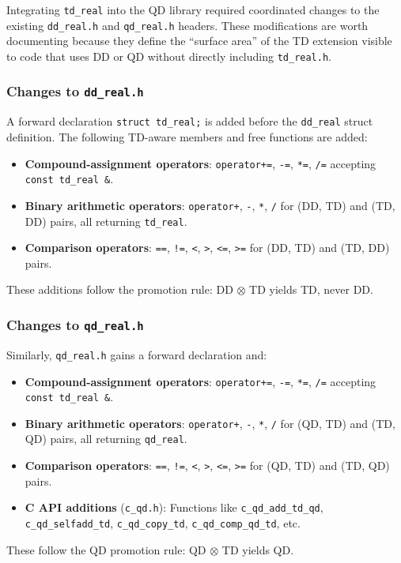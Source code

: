 \documentclass[11pt,a4paper]{article}
\begin{document}
Integrating \texttt{td\_real} into the QD library required
coordinated changes to the existing \texttt{dd\_real.h} and
\texttt{qd\_real.h} headers.  These modifications are worth
documenting because they define the ``surface area'' of the TD
extension visible to code that uses DD or QD without directly
including \texttt{td\_real.h}.

\subsubsection{Changes to \texttt{dd\_real.h}}

A forward declaration \texttt{struct td\_real;} is added before
the \texttt{dd\_real} struct definition.  The following TD-aware
members and free functions are added:
\begin{itemize}
\item \textbf{Compound-assignment operators}:
  \texttt{operator+=}, \texttt{-=}, \texttt{*=}, \texttt{/=}
  accepting \texttt{const td\_real \&}.
\item \textbf{Binary arithmetic operators}:
  \texttt{operator+}, \texttt{-}, \texttt{*}, \texttt{/} for
  (DD, TD) and (TD, DD) pairs, all returning \texttt{td\_real}.
\item \textbf{Comparison operators}:
  \texttt{==}, \texttt{!=}, \texttt{<}, \texttt{>}, \texttt{<=},
  \texttt{>=} for (DD, TD) and (TD, DD) pairs.
\end{itemize}
These additions follow the promotion rule: DD $\otimes$ TD yields
TD, never DD.

\subsubsection{Changes to \texttt{qd\_real.h}}

Similarly, \texttt{qd\_real.h} gains a forward declaration and:
\begin{itemize}
\item \textbf{Compound-assignment operators}:
  \texttt{operator+=}, \texttt{-=}, \texttt{*=}, \texttt{/=}
  accepting \texttt{const td\_real \&}.
\item \textbf{Binary arithmetic operators}:
  \texttt{operator+}, \texttt{-}, \texttt{*}, \texttt{/} for
  (QD, TD) and (TD, QD) pairs, all returning \texttt{qd\_real}.
\item \textbf{Comparison operators}:
  \texttt{==}, \texttt{!=}, \texttt{<}, \texttt{>}, \texttt{<=},
  \texttt{>=} for (QD, TD) and (TD, QD) pairs.
\item \textbf{C API additions} (\texttt{c\_qd.h}):
  Functions like \texttt{c\_qd\_add\_td\_qd},
  \texttt{c\_qd\_selfadd\_td}, \texttt{c\_qd\_copy\_td},
  \texttt{c\_qd\_comp\_qd\_td}, etc.
\end{itemize}
These follow the QD promotion rule: QD $\otimes$ TD yields QD.
\end{document}

